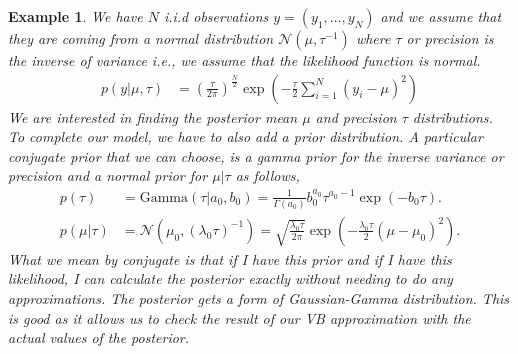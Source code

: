 \documentclass[10pt ]{article}
\newtheorem{example}{Example}
\begin{document}
\begin{example}
{\em We have $N$ i.i.d observations $y = (y_1, \dots, y_N )$ and we assume that they are coming from a normal distribution $\mathcal{N}(\mu, \tau^{-1})$ where $\tau$ or precision  is the inverse of variance i.e., we assume that the likelihood function is normal. 
\begin{align}
p(y | \mu, \tau ) & = \left( \frac{\tau}{2 \pi }\right)^{\frac{N}{2}} \exp \left( -\frac{\tau}{2}  \sum_{i=1}^N (y_i - \mu)^2 \right)
\label{eq_gaussian_models}
\end{align}
We are interested in finding the posterior mean $\mu$ and precision $\tau$ distributions.  To complete our model, we have to also add a prior distribution. A particular conjugate prior that we can choose, is a gamma prior for the inverse variance or precision and a normal prior for $ \mu | \tau $  as follows, 
\begin{align}
p(\tau) &= \mathrm{Gamma}(\tau | a_0, b_0) = \frac{1}{\Gamma(a_0)} b_0^{a_0}{\tau^{a_0-1}} \exp(-{b_0}{\tau}). \\
p(\mu | \tau) & =    \mathcal{N}(\mu_0, (\lambda_0 \tau)^{-1}) = \sqrt{\frac{\lambda_0 \tau}{2 \pi}} \exp \left( -\frac{\lambda_0 \tau}{2} (\mu - \mu_0)^2\right).
\end{align}
 What we mean by conjugate is that if I have this prior and if I have this likelihood, I can calculate the posterior exactly without needing to do any approximations.  The posterior gets a form of Gaussian-Gamma distribution. This is good as it allows us to check the result of our VB approximation with the actual values of the posterior.  
 
}
\end{example}
\end{document}
